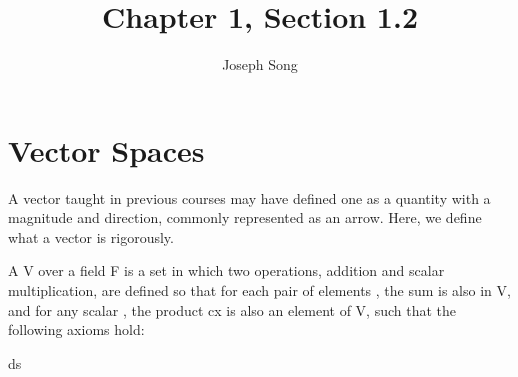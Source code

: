 \documentclass{article}
\title{Chapter 1, Section 1.2}
\author{Joseph Song}
\date{}
\begin{document}
\maketitle

\section{Vector Spaces}

A vector taught in previous courses may have defined one as a quantity with a magnitude and direction, commonly represented as an arrow. Here, we define what a vector is rigorously.

\begin{definition}
A  V over a field F is a set in which two operations, addition and scalar multiplication, are defined so that for each pair of elements , the sum  is also in V, and for any scalar , the product cx is also an element of V, such that the following axioms hold:
\end{definition}


\begin{axioms}
    \item ds
    \item
\end{axioms}
\end{document}
